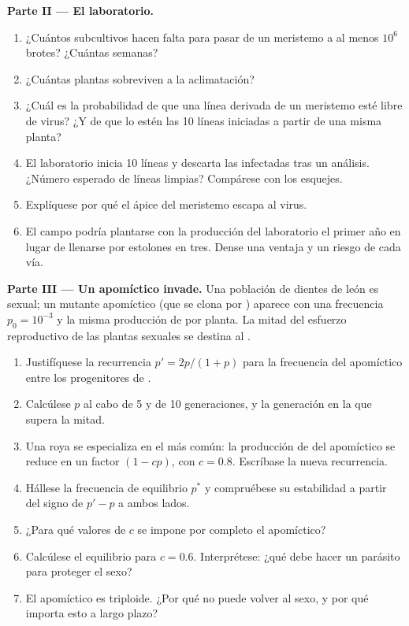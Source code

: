\begin{problem}
\medskip
\noindent\textbf{Parte II --- El laboratorio.}
\begin{enumerate}[resume]
  \item ¿Cuántos subcultivos hacen falta para pasar de un meristemo a al
        menos $10^{6}$ brotes? ¿Cuántas semanas?
  \item ¿Cuántas plantas sobreviven a la aclimatación?
  \item ¿Cuál es la probabilidad de que una línea derivada de un
        meristemo esté libre de virus? ¿Y de que lo estén las \num{10}
        líneas iniciadas a partir de una misma planta?
  \item El laboratorio inicia \num{10} líneas y descarta las infectadas
        tras un análisis. ¿Número esperado de líneas limpias? Compárese
        con los esquejes.
  \item Explíquese por qué el ápice del meristemo escapa al virus.
  \item El campo podría plantarse con la producción del laboratorio el
        primer año en lugar de llenarse por estolones en tres. Dense una
        ventaja y un riesgo de cada vía.
\end{enumerate}

\medskip
\noindent\textbf{Parte III --- Un apomíctico invade.}
Una población de dientes de león es sexual; un mutante apomíctico (que se
clona por ) aparece con una frecuencia $p_0 = 10^{-3}$ y la misma
producción de  por planta. La mitad del esfuerzo reproductivo de
las plantas sexuales se destina al .
\begin{enumerate}[resume]
  \item Justifíquese la recurrencia $p' = 2p/(1 + p)$ para la frecuencia
        del apomíctico entre los progenitores de .
  \item Calcúlese $p$ al cabo de 5 y de 10 generaciones, y la generación
        en la que supera la mitad.
  \item Una roya se especializa en el  más común: la producción de
         del apomíctico se reduce en un factor $(1 - cp)$, con
        $c = 0.8$. Escríbase la nueva recurrencia.
  \item Hállese la frecuencia de equilibrio $p^*$ y compruébese su
        estabilidad a partir del signo de $p' - p$ a ambos lados.
  \item ¿Para qué valores de $c$ se impone por completo el apomíctico?
  \item Calcúlese el equilibrio para $c = 0.6$. Interprétese: ¿qué debe
        hacer un parásito para proteger el sexo?
  \item El apomíctico es triploide. ¿Por qué no puede volver al sexo, y
        por qué importa esto a largo plazo?
\end{enumerate}


\end{problem}
